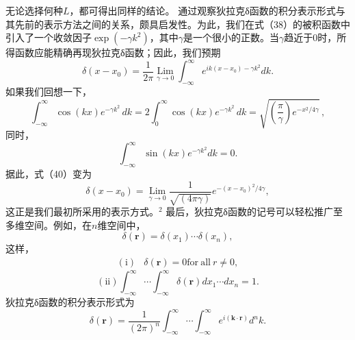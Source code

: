 无论选择何种\(L\)，都可得出同样的结论。
通过观察狄拉克δ函数的积分表示形式与其先前的表示方法之间的关系，颇具启发性。为此，我们在式（38）的被积函数中引入了一个收敛因子\(\exp(-\gamma k^2)\)，其中\(\gamma\)是一个很小的正数。当\(\gamma\)趋近于0时，所得函数应能精确再现狄拉克δ函数；因此，我们预期
\begin{equation}\tag{17.2.43}\label{eq:17.2.43}
\delta ( x - x _ { 0 } ) = \frac { 1 } { 2 \pi } \operatorname* { L i m } _ { \gamma \to 0 } \int _ { - \infty } ^{\infty} e ^{i k ( x - x _ { 0} ) - \gamma k ^{2} } d k .
\end{equation}
如果我们回想一下，
\begin{equation}\tag{17.2.44}\label{eq:17.2.44}
\int _ { - \infty } ^{\infty} \cos ( k x ) e ^{- \gamma k ^ { 2} } \, d k = 2 \int _ { 0 } ^{\infty} \cos ( k x ) e ^{- \gamma k ^ { 2} } \, d k = \sqrt { \left( \frac { \pi } { \gamma } \right) e ^{- x ^ { 2} / 4 \gamma } } \, ,
\end{equation}
同时，
\begin{equation}\tag{17.2.45}\label{eq:17.2.45}
\int _ { - \infty } ^{\infty} \sin ( k x ) e ^{- \gamma k ^ { 2} } d k = 0 .
\end{equation}
据此，式（40）变为
\begin{equation}\tag{17.2.46}\label{eq:17.2.46}
\delta ( x - x _ { 0 } ) = \operatorname* { L i m } _ { \gamma \to 0 } \frac { 1 } { \sqrt { ( 4 \pi \gamma ) } } e ^{- ( x - x _ { 0} ) ^{2} / 4 \gamma } ,
\end{equation}
这正是我们最初所采用的表示方式。\(^{2}\)
最后，狄拉克δ函数的记号可以轻松推广至多维空间。例如，在\(n\)维空间中，
\begin{equation}\tag{17.2.47}\label{eq:17.2.47}
\delta ( \pmb { r } ) = \delta ( x _ { 1 } ) \cdots \delta ( x _ { n } ) ,
\end{equation}
这样，
\begin{equation}\tag{17.2.48}\label{eq:17.2.48}
\begin{array}{rl} { \mathrm { ( i ) } } & { { } \delta ( \pmb { r } ) = 0  \mathrm { f o r ~ a l l ~ } r \neq 0 , } \end{array}
\end{equation}
\begin{equation}\tag{17.2.49}\label{eq:17.2.49}
( \mathrm { i i } )  \int _ { - \infty } ^{\infty} \cdots \int _ { - \infty } ^{\infty} \delta ( \boldsymbol { r } ) d x _ { 1 } \cdots d x _ { n } = 1 .
\end{equation}
狄拉克δ函数的积分表示形式为
\begin{equation}\tag{17.2.50}\label{eq:17.2.50}
\delta ( \pmb { r } ) = \frac { 1 } { ( 2 \pi ) ^{n} } \int _ { - \infty } ^{\infty} \cdots \int _ { - \infty } ^{\infty} e ^{i ( \pmb { k} \cdot \pmb { r } ) } d ^{n} k .
\end{equation}

